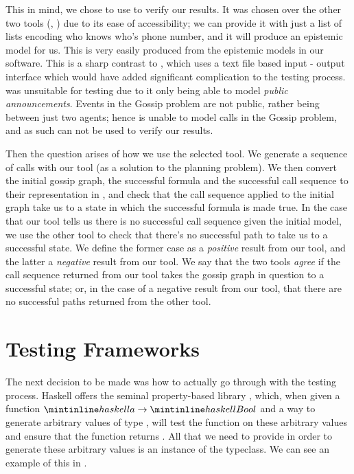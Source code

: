 \documentclass[10pt, a4paper]{report}
\begin{document}
This in mind, we chose to use \cite{GithubGossip} to verify our results. It was
chosen over the other two tools (\cite{SMCDEL}, \cite{DEMO-S5}) due to its ease
of accessibility; we can provide it with just a list of lists encoding who knows
who's phone number, and it will produce an epistemic model for us. This is very
easily produced from the epistemic models in our software. This is a sharp
contrast to \cite{SMCDEL}, which uses a text file based input - output interface
which would have added significant complication to the testing process.
\cite{DEMO-S5} was unsuitable for testing due to it only being able to model
\emph{public announcements}. Events in the Gossip problem are not public, rather
being between just two agents; hence \cite{DEMO-S5} is unable to model calls in
the Gossip problem, and as such can not be used to verify our results.

Then the question arises of how we use the selected tool. We generate a sequence
of calls with our tool (as a solution to the planning problem). We then convert
the initial gossip graph, the successful formula and the successful call
sequence to their representation in \cite{GithubGossip}, and check that the call
sequence applied to the initial graph take us to a state in which the successful
formula is made true. In the case that our tool tells us there is no successful
call sequence given the initial model, we use the other tool to check that
there's no successful path to take us to a successful state. We define the
former case as a \emph{positive} result from our tool, and the latter a
\emph{negative} result from our tool. We say that the two tools \emph{agree} if
the call sequence returned from our tool takes the gossip graph in question to a
successful state; or, in the case of a negative result from our tool, that there
are no successful paths returned from the other tool.

\section{Testing Frameworks}
\label{sec:TestingFrameworks}

The next decision to be made was how to actually go through with the testing
process. Haskell offers the seminal property-based library ,
which, when given a function $\mih{a} \rightarrow \mih{Bool}$ and a way to
generate arbitrary values of type , will test the function on these
arbitrary values and ensure that the function returns . All that we need
to provide in order to generate these arbitrary values is an instance of the
 typeclass. We can see an example of this in .
\end{document}
